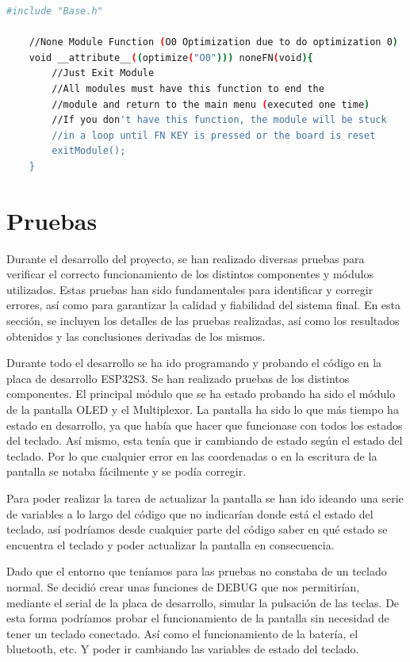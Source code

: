 \begin{lstlisting}[style=console, language=bash, caption={La función base vacía que no hace nada a forma de ejemplo. En base.h y base.cpp}, label={code:BaseFuncion}]
    #include "Base.h"

    //None Module Function (O0 Optimization due to do optimization 0)
    void __attribute__((optimize("O0"))) noneFN(void){
        //Just Exit Module
        //All modules must have this function to end the
        //module and return to the main menu (executed one time)
        //If you don't have this function, the module will be stuck 
        //in a loop until FN KEY is pressed or the board is reset
        exitModule();
    }
\end{lstlisting}

\section{Pruebas}\label{ApendicePruebas}
Durante el desarrollo del proyecto, se han realizado diversas pruebas para verificar el correcto funcionamiento de los distintos componentes y módulos utilizados. Estas pruebas han sido fundamentales para identificar y corregir errores, así como para garantizar la calidad y fiabilidad del sistema final. En esta sección, se incluyen los detalles de las pruebas realizadas, así como los resultados obtenidos y las conclusiones derivadas de los mismos.

Durante todo el desarrollo se ha ido programando y probando el código en la placa de desarrollo ESP32S3. Se han realizado pruebas de los distintos componentes. El principal módulo que se ha estado probando ha sido el módulo de la pantalla \gls{OLED} y el Multiplexor. La pantalla ha sido lo que más tiempo ha estado en desarrollo, ya que había que hacer que funcionase con todos los estados del teclado. Así mismo, esta tenía que ir cambiando de estado según el estado del teclado. Por lo que cualquier error en las coordenadas o en la escritura de la pantalla se notaba fácilmente y se podía corregir.

Para poder realizar la tarea de actualizar la pantalla se han ido ideando una serie de variables a lo largo del código que no indicarían donde está el estado del teclado, así podríamos desde cualquier parte del código saber en qué estado se encuentra el teclado y poder actualizar la pantalla en consecuencia.

Dado que el entorno que teníamos para las pruebas no constaba de un teclado normal. Se decidió crear unas funciones de \gls{DEBUG} que nos permitirían, mediante el serial de la placa de desarrollo, simular la pulsación de las teclas. De esta forma podríamos probar el funcionamiento de la pantalla sin necesidad de tener un teclado conectado. Así como el funcionamiento de la batería, el bluetooth, etc. Y poder ir cambiando las variables de estado del teclado.

